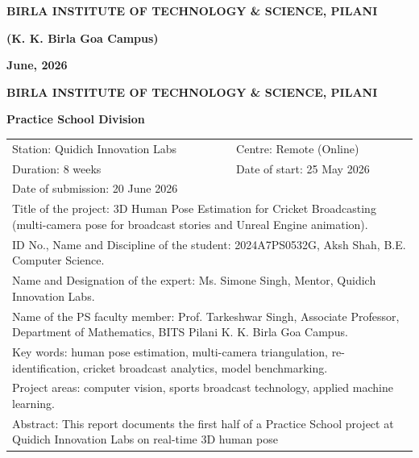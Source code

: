 \documentclass[oneside,openany]{book}
\begin{document}
	\centerline{\bf BIRLA INSTITUTE OF TECHNOLOGY \& SCIENCE, PILANI}
	\vspace*{0.3cm}
	\centerline{\bf (K. K. Birla Goa Campus)}
	\vspace*{0.4cm}
	\centerline{\bf June, 2026}
	\newpage

\thispagestyle{empty}

	\centerline{\bf BIRLA INSTITUTE OF TECHNOLOGY \& SCIENCE, PILANI}
	\vspace*{0.2cm}
	\centerline{\bf Practice School Division}
	\vspace*{0.3cm}
	{\normalsize
		\setlength{\extrarowheight}{2pt}
		\begin{tabular}{p{6.2cm}p{9.3cm}}
			Station: Quidich Innovation Labs & \hspace*{0.5cm} Centre: Remote (Online) \\[7pt]
			Duration: 8 weeks &\hspace*{0.5cm} Date of start: 25 May 2026 \\[7pt]
			Date of submission: 20 June 2026 & {} \\[7pt]
			\multicolumn{2}{p{15.5cm}}{Title of the project: 3D Human Pose Estimation for
			Cricket Broadcasting (multi-camera pose for broadcast stories and Unreal Engine
			animation).} \\[7pt]
			\multicolumn{2}{p{15.5cm}}{ID No., Name and Discipline of the student:
			2024A7PS0532G, Aksh Shah, B.E. Computer Science.} \\[7pt]
			\multicolumn{2}{p{15.5cm}}{Name and Designation of the expert: Ms. Simone Singh,
			Mentor, Quidich Innovation Labs.} \\[7pt]
			\multicolumn{2}{p{15.5cm}}{Name of the PS faculty member: Prof. Tarkeshwar Singh,
			Associate Professor, Department of Mathematics, BITS Pilani K. K. Birla Goa
			Campus.} \\[7pt]
			\multicolumn{2}{p{15.5cm}}{Key words: human pose estimation, multi-camera
			triangulation, re-identification, cricket broadcast analytics, model
			benchmarking.} \\[7pt]
			\multicolumn{2}{p{15.5cm}}{Project areas: computer vision, sports broadcast
			technology, applied machine learning.} \\[7pt]
			\multicolumn{2}{p{15.5cm}}{Abstract: This report documents the first half of a
			Practice School project at Quidich Innovation Labs on real-time 3D human pose
}
\end{tabular}}
\end{document}

